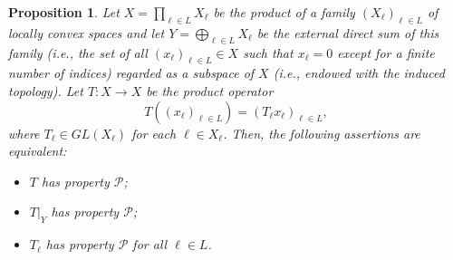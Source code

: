 \documentclass[12pt]{amsart}
\theoremstyle{theorem}
\newtheorem{proposition}[theorem]{Proposition}
\theoremstyle{definition}
\theoremstyle{remark} \theoremstyle{question} \theoremstyle{example}
\newcommand{\cP}{\mathcal{P}}
\begin{document}
\begin{proposition}\label{Gen-P4}
Let $X = \prod_{\ell \in L} X_\ell$ be the product of a family $(X_\ell)_{\ell \in L}$ of locally convex spaces and 
let $Y = \bigoplus_{\ell \in L} X_\ell$ be the external direct sum of this family 
(i.e., the set of all $(x_\ell)_{\ell \in L} \in X$ such that $x_\ell = 0$ except for a finite number of indices)
regarded as a subspace of $X$ (i.e., endowed with the induced topology).
Let $T : X \to X$ be the product operator
\[
T((x_\ell)_{\ell \in L}) = (T_\ell x_\ell)_{\ell \in L},
\]
where $T_\ell \in GL(X_\ell)$ for each $\ell \in X_\ell$. Then, the following assertions are equivalent:
\begin{itemize}
\item [\rm (i)] $T$ has property $\cP$;
\item [\rm (ii)] $T|_Y$ has property $\cP$;
\item [\rm (iii)] $T_\ell$ has property $\cP$ for all $\ell \in L$.
\end{itemize}
\end{proposition}
\end{document}
